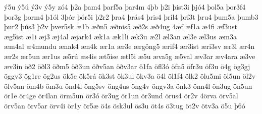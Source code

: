 {^^fd5u
^^fd5^^fa
^^fd3v
^^fd5y
z^^f34
^^fe2a
^^feam4
^^fearf5a
^^fear4m
4^^feb
^^fe2i
^^feist3i
^^fej^^f34
^^feol5a
^^feor3f4
^^feor3g
^^feorm4
^^fe1^^f3l
3^^fe^^f3r
^^fe^^f3r5i
^^fe2r2
^^fera4
^^fer^^e1s4
^^feris4
^^fer^^edl4
^^fer^^ed3t
^^feru4
^^feum5a
^^feumb3
^^feur2
^^fe^^fas3
^^fe2v
^^fever5sk
^^e61b
^^e6^^f0n5
^^e6^^f0nis5
^^e6^^f02s
^^e6^^f04ug
4^^e6f
^^e6f1a
^^e64fi
^^e6f3ust
^^e6g5ist
^^e61i
^^e6j3
^^e6j4al
^^e6jark4
^^e6k1a
^^e6k1li
^^e6k3u
^^e62l
^^e6l3an
^^e6l3e
^^e6l3us
^^e6m3a
^^e6m4al
^^e64mundu
^^e6nak4
^^e6n4k
^^e6r1a
^^e6r3e
^^e6rg^^f6ng5
^^e6rif4
^^e6r3ist
^^e6ri3sv
^^e6r3l
^^e6r4n
^^e6r2s
^^e6r5un
^^e6r1us
^^e65r^^fa
^^e6s4is
^^e6t5ise
^^e6tl5i
^^e65u
^^e6va5g
^^e65val
^^e6v3ar
^^e6v4ara
^^e63ve
^^e6v3in
^^f6^^f02
^^f6^^f0l3
^^f6^^f0m5
^^f6^^f03un
^^f6^^f0v5an
^^f6^^f0v3ar
^^f61fa
^^f6fl3^^f3
^^f6fn5
^^f6fr3u
^^f6f3u
^^f64g
^^f6g3gj
^^f6ggv3
^^f6g1re
^^f6g2us
^^f6k5e
^^f6k5r^^e1
^^f6k3st
^^f6k3ul
^^f6kv3a
^^f64l
^^f6l1f4
^^f6lk2
^^f6lu5mi
^^f6l5un
^^f6l2v
^^f6lv5an
^^f6m4b
^^f6m3u
^^f6nd4l
^^f6ng5sv
^^f6ng4us
^^f6ng4v
^^f6ngv3a
^^f6nk3
^^f6nn4l
^^f6n3ug
^^f6n5un
^^f6r1e
^^f6r4ge
^^f6r4lan
^^f6rm5un
^^f6r3^^f3
^^f6r3ug
^^f6r1un
^^f6r3und
^^f6rus4
^^f6r2v
4^^f6rva
^^f6rv5al
^^f6rv5an
^^f6rv5ar
^^f6rv4i
^^f6r1y
^^f6r5^^e6
^^f64s
^^f6sk3ul
^^f6s3u
^^f6t4s
^^f63tug
^^f6t2v
^^f6tv3a
^^f65u
^^fe6^^f3
}
\hyphenation{
}
